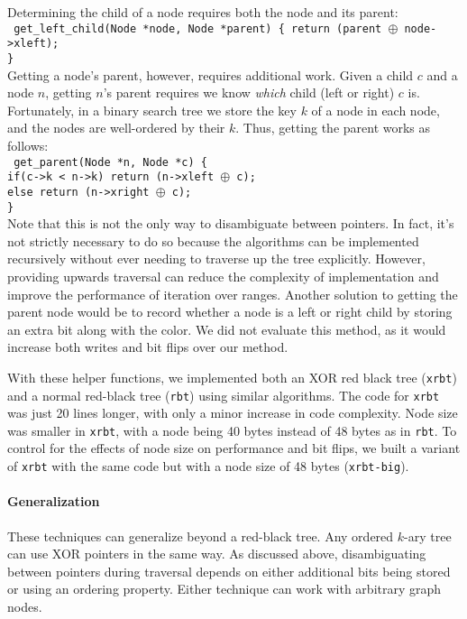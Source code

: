 Determining the child of a node requires both the node and its parent:\\
\texttt{
get\_left\_child(Node *node, Node *parent) \{
	\indent return (parent $\oplus$ node->xleft); \\
\}
}\\
Getting a node's parent, however, requires additional work. Given a child $c$ and a
node $n$, getting $n$'s parent requires we know \textit{which} child (left or
right) $c$ is. Fortunately, in a binary search tree we store the key $k$ of a node
in each node, and the nodes are well-ordered by their $k$. Thus, getting the
parent works as follows:\\
\texttt{
get\_parent(Node *n, Node *c) \{\\
	\indent if(c->k < n->k) return (n->xleft $\oplus$ c);\\
	\indent else return (n->xright $\oplus$ c);\\
	\}}\\
Note that this is not the only way to disambiguate between pointers. In fact,
it's not strictly necessary to do so because the algorithms can be implemented
recursively without ever needing to traverse up the tree explicitly. However, providing upwards
traversal can reduce the complexity of implementation and improve the performance of iteration over
ranges. Another
solution to getting the parent node would be to record whether a node is a left
or right child by storing an extra bit along with the color. We did not
evaluate this method, as it would increase both writes and bit flips over our method.

\newcommand{\xrbt}{\texttt{xrbt}\xspace}
\newcommand{\xrbtbig}{\texttt{xrbt-big}\xspace}
\newcommand{\rbt}{\texttt{rbt}\xspace}

With these helper functions, we implemented both an XOR red black
tree (\xrbt) and a normal red-black tree (\rbt) using similar algorithms.
The code for \xrbt was just 20 lines longer, with only a
minor increase in code complexity. Node size was smaller in \xrbt,
with a node being 40 bytes instead of 48 bytes as in \rbt. To control for
the effects of node size on performance and bit flips, we built a variant of
\xrbt with the same code but with a node size of 48 bytes (\xrbtbig).


\paragraph{Generalization} These techniques can generalize beyond a red-black tree. Any ordered
$k$-ary tree can use XOR pointers in the same way. As discussed above, disambiguating between pointers
during traversal depends on either additional bits being stored or using an ordering property.
Either technique can work with arbitrary graph nodes.

